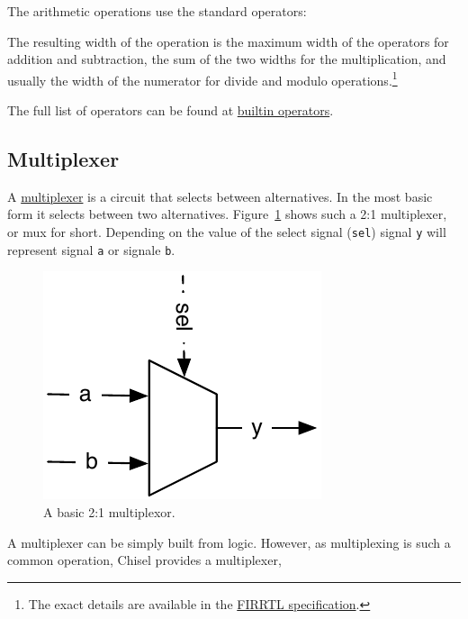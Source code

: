\documentclass[%
    10pt, %
    headinclude, footexclude,
    openright, %
    notitlepage,
    cleardoubleempty,
    headsepline,
    pointlessnumbers,
    bibtotoc, idxtotoc,
    ]{scrbook}
\newcommand{\code}[1]{{\small{\texttt{#1}}}}
\newcommand{\myref}[2]{\href{#1}{#2}}
\begin{document}


\noindent The arithmetic operations use the standard operators:



\noindent The resulting width of the operation is the maximum width of the operators for
addition and subtraction, the sum of the two widths for the multiplication, and usually
the width of the numerator for divide and modulo operations.\footnote{The exact
details are available in the \myref{https://github.com/freechipsproject/firrtl/blob/master/spec/spec.pdf}{FIRRTL specification}.}



The full list of operators can be found at
\myref{https://github.com/freechipsproject/chisel3/wiki/Builtin-Operators}{builtin operators}.

\subsection{Multiplexer}

A \myref{https://en.wikipedia.org/wiki/Multiplexer}{multiplexer} is a circuit that selects between alternatives.
In the most basic form it selects between two alternatives. Figure~\ref{fig:mux} shows
such a 2:1 multiplexer, or mux for short. Depending on the value of the
select signal (\code{sel}) signal \code{y} will represent signal \code{a} or
signale \code{b}.

\begin{figure}
  \centering
  \includegraphics[scale=0.7]{figures/mux}
  \caption{A basic 2:1 multiplexor.}
  \label{fig:mux}
\end{figure}

A multiplexer can be simply built from logic.
However, as multiplexing  is such a common operation, Chisel provides a multiplexer,
\end{document}
